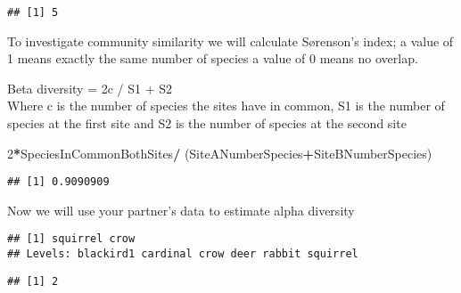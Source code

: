 \documentclass[]{book}
\newenvironment{Shaded}{\begin{snugshade}}{\end{snugshade}}
\newcommand{\DecValTok}[1]{\textcolor[rgb]{0.00,0.00,0.81}{#1}}
\newcommand{\KeywordTok}[1]{\textcolor[rgb]{0.13,0.29,0.53}{\textbf{#1}}}
\newcommand{\NormalTok}[1]{#1}
\newcommand{\OperatorTok}[1]{\textcolor[rgb]{0.81,0.36,0.00}{\textbf{#1}}}
\newcommand{\StringTok}[1]{\textcolor[rgb]{0.31,0.60,0.02}{#1}}
\begin{document}
\begin{verbatim}
## [1] 5
\end{verbatim}

To investigate community similarity we will calculate Sørenson's index; a value of 1 means exactly the same number of species a value of 0 means no overlap.

Beta diversity = 2c / S1 + S2\\
Where c is the number of species the sites have in common, S1 is the number of species at the first site and S2 is the number of species at the second site

\begin{Shaded}
\begin{Highlighting}[]
\DecValTok{2}\OperatorTok{*}\NormalTok{SpeciesInCommonBothSites}\OperatorTok{/}\StringTok{ }\NormalTok{(SiteANumberSpecies}\OperatorTok{+}\NormalTok{SiteBNumberSpecies)}
\end{Highlighting}
\end{Shaded}

\begin{verbatim}
## [1] 0.9090909
\end{verbatim}

Now we will use your partner's data to estimate alpha diversity

\begin{Shaded}
\end{Shaded}

\begin{verbatim}
## [1] squirrel crow    
## Levels: blackird1 cardinal crow deer rabbit squirrel
\end{verbatim}

\begin{Shaded}
\end{Shaded}

\begin{verbatim}
## [1] 2
\end{verbatim}
\end{document}
